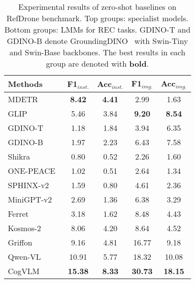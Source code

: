 \begin{table}[t]
\caption{Experimental results of zero-shot baselines on RefDrone benchmark. Top groups: specialist models. Bottom groups: LMMs for REC tasks. GDINO-T and GDINO-B denote GroundingDINO~\cite{gdino} with Swin-Tiny and Swin-Base backbones. The best results in each group are denoted with \textbf{bold}.}

\label{tab:zeroshot}
  \centering
\begin{adjustbox}{width=\linewidth}
  \begin{tabular}{l  c  c c c }
    \toprule
    Methods & F1$_{inst.}$ & Acc$_{inst.}$ & F1$_{img.}$ & Acc$_{img.}$ \\
    \midrule 
MDETR~\cite{mdetr}  & \textbf{8.42} & \textbf{4.41} & 2.99 & 1.63 \\
GLIP~\cite{glip}  & 5.46 & 3.84 & \textbf{9.20 }& \textbf{8.54} \\
GDINO-T~\cite{gdino}  & 1.18 & 1.84 & 3.94 & 6.35 \\
GDINO-B~\cite{gdino}  & 1.97 & 2.23 & 6.43 & 7.58 \\

\midrule

Shikra~\cite{chen2023shikra} & 0.80 & 0.52 & 2.26 & 1.60 \\
ONE-PEACE~\cite{one_peace} & 1.02 & 0.51 & 2.64 & 1.34 \\
SPHINX-v2~\cite{lin2023sphinx} & 1.59 & 0.80  & 4.61 & 2.36 \\
MiniGPT-v2~\cite{chen2023minigpt}  & 2.69 & 1.36 & 6.38 & 3.29 \\
Ferret~\cite{you2023ferret}  & 3.18 & 1.62 & 8.48 & 4.43 \\
Kosmos-2~\cite{peng2023kosmos}  & 8.06 & 4.20 & 8.64 & 4.52 \\
Griffon~\cite{zhan2025griffon} &  9.16  &  4.81  & 16.77   & 9.18   \\
Qwen-VL~\cite{bai2023qwen} & 10.91 & 5.77 & 18.32 & 10.08 \\
CogVLM~\cite{wang2023cogvlm} & \textbf{15.38 } & \textbf{8.33}  & \textbf{30.73}  & \textbf{18.15 }\\
 
\bottomrule

\end{tabular}
\end{adjustbox}

\end{table}
